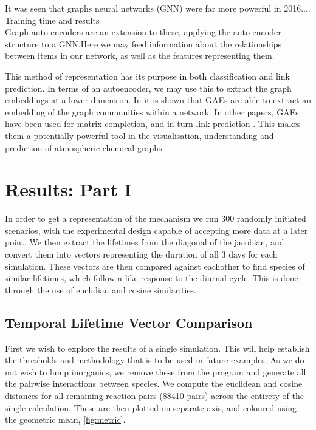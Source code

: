 \documentclass{pasa}%
\begin{document}
It was seen that graphs neural networks (GNN) were far more powerful in 2016....
Training time and results\\

Graph auto-encoders are an extension to these, applying the auto-encoder structure to a GNN.Here we may feed information about the relationships between items in our network, as well as the features representing them. 

This method of representation has its purpose in both classification and link prediction. In terms of an autoencoder, we may use this to extract the graph embeddings at a lower dimension. In \cite{karatAE} it is shown that GAEs are able to extract an embedding of the graph communities within a network. In other papers, GAEs have been used for matrix completion, and in-turn link prediction \cite{gaelink}. This makes them a potentially powerful tool in the visualisation, understanding and prediction of atmospheric chemical graphs. 

 





\section{Results: Part I}

In order to get a representation of the mechanism we run 300 randomly initiated scenarios, with the experimental design capable of accepting more data at a later point. We then extract the lifetimes from the diagonal of the jacobian, and convert them into vectors representing the duration of all 3 days for each simulation. These vectors are then compared against eachother to find species of similar lifetimes, which follow a like response to the diurnal cycle. This is done through the use of euclidian and cosine similarities. 

\subsection{Temporal Lifetime Vector Comparison}
First we wish to explore the results of a single simulation. This will help establish the thresholds and methodology that is to be used in future examples. As we do not wish to lump inorganics, we remove these from the program and generate all the pairwise interactions between species. We compute the euclidean and cosine distances for all remaining reaction pairs (88410 pairs) across the entirety of the single calculation. These are then plotted on separate axis, and coloured using the geometric mean, \autoref{fig:metric}. \\
\end{document}
